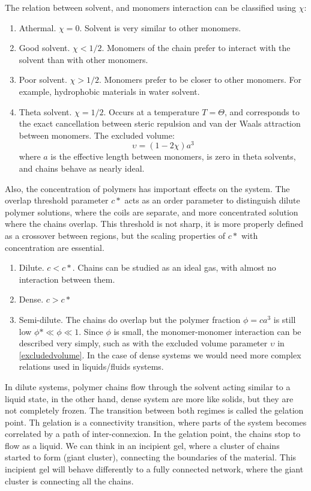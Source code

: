 The relation between solvent, and monomers interaction can be classified using
$\chi$:
\begin{enumerate}
  \item Athermal. $\chi=0$. Solvent is very similar to other monomers.
  \item Good solvent. $\chi<1/2$. Monomers of the chain prefer to interact with
  the solvent than with other monomers.
  \item Poor solvent. $\chi>1/2$. Monomers prefer to be closer to other
  monomers. For example, hydrophobic materials in water solvent.
  \item Theta solvent. $\chi=1/2$. Occurs at a temperature $T=\Theta$, and
  corresponds to the exact cancellation between steric repulsion and van der
  Waals attraction between monomers. The excluded volume:
  \begin{equation}\label{excludedvolume}
  \upsilon=(1-2\chi)a^3
  \end{equation}
  where $a$ is the effective length between monomers, is zero in theta solvents,
  and chains behave as nearly ideal.\citep{gennes_scaling_1979}
\end{enumerate}

Also, the concentration of polymers has important effects on the system. The
overlap threshold parameter $c*$ acts as an order parameter to distinguish dilute
polymer solutions, where the coils are separate, and more concentrated solution
where the chains overlap. This threshold is not sharp, it is more properly
defined as a crossover between regions, but the scaling properties of $c*$ with
concentration are essential.
\begin{enumerate}
  \item Dilute. $c<c*$. Chains can be studied as an ideal gas, with almost no
  interaction between them.
  \item Dense. $c>c*$
  \item Semi-dilute. The chains do overlap but the polymer fraction
  $\phi=ca^3$ is still low $\phi*\ll\phi\ll1$. Since $\phi$ is small, the monomer-monomer interaction can
  be described very simply, such as with the excluded volume parameter
  $\upsilon$ in \ref{excludedvolume}. In the case of dense systems we would need more complex
  relations used in liquids/fluids systems.
\end{enumerate}


In dilute systems, polymer chains flow through
the solvent acting similar to a liquid state, in the other hand, dense system
are more like solids, but they are not completely frozen. The transition between
both regimes is called the gelation point. Th gelation is a connectivity
transition, where parts of the system becomes correlated by a path of
inter-connexion. In the gelation point, the chains stop to flow as a liquid. We
can think in an incipient gel, where a cluster of chains started to form (giant cluster), connecting the boundaries of the
material. This incipient gel will behave differently to a fully connected
network, where the giant cluster is connecting all the chains.

